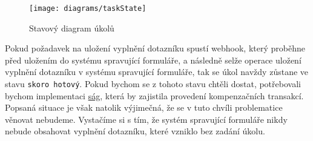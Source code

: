 \begin{figure}[H]
    \texttt{[image: diagrams/taskState]}
    \caption{Stavový diagram úkolů}\label{fig:task-state}
\end{figure}


Pokud požadavek na uložení vyplnění dotazníku spustí webhook, který proběhne před uložením do systému spravující formuláře, a následně selže operace uložení vyplnění dotazníku v systému spravující formuláře, tak se úkol navždy zůstane ve stavu \texttt{skoro hotový}.
Pokud bychom se z tohoto stavu chtěli dostat, potřebovali bychom implementaci \href{https://microservices.io/patterns/data/saga.html}{ság}, která by zajistila provedení kompenzačních transakcí.
Popsaná situace je však natolik výjimečná, že se v tuto chvíli problematice věnovat nebudeme.
Vystačíme si s tím, že systém spravující formuláře nikdy nebude obsahovat vyplnění dotazníku, které vzniklo bez zadání úkolu.

